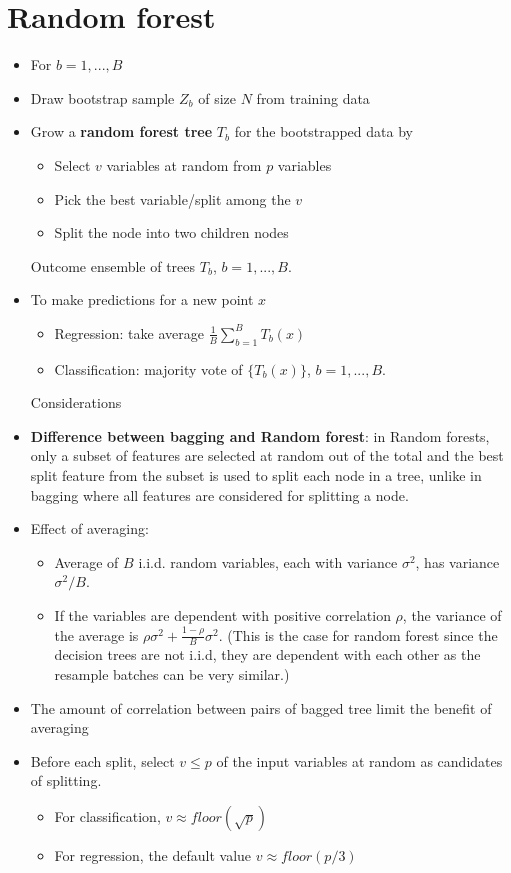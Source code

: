 \documentclass[twoside,12pt]{article}
\begin{document}
\section{Random forest}
\begin{itemize}
\item For $b=1,...,B$
\item Draw bootstrap sample $Z_b$ of size $N$ from training data
\item Grow a \textbf{random forest tree} $T_b$ for the bootstrapped data by 
\begin{itemize}
\item Select $v$ variables at random from $p$ variables 
\item Pick the best variable/split among the $v$ 
\item Split the node into two children nodes \\
\end{itemize}
Outcome ensemble of trees $T_b$, $b = 1, ..., B$.
\item To make predictions for a new point $x$
\begin{itemize}
\item Regression: take average $\frac 1 B \sum_{b = 1}^B T_b(x)$
\item Classification: majority vote of $\{T_b(x)\}$, $b = 1, ..., B.$
\end{itemize}
\noindent Considerations 
\item \textbf{Difference between bagging and Random forest}: in Random forests, only a subset of features are selected at random out of the total and the best split feature from the subset is used to split each node in a tree, unlike in bagging where all features are considered for splitting a node.

\item Effect of averaging: 
\begin{itemize}
\item Average of $B$ i.i.d. random variables, each with variance $\sigma^2$, has variance $\sigma^2/B$.
\item If the variables are dependent with positive correlation $\rho$, the variance of the average is $\rho \sigma^2 + \frac{1-\rho}{B}\sigma^2$. (This is the case for random forest since the decision trees are not i.i.d, they are dependent with each other as the resample batches can be very similar.)
\end{itemize}
\item The amount of correlation between pairs of bagged tree limit the benefit of averaging 
\item Before each split, select $v \leq p$ of the input variables at random as candidates of splitting.
\begin{itemize}
\item For classification, $v \approx floor(\sqrt{p})$
\item For regression, the default value $v \approx floor(p/3)$
\end{itemize}
\end{itemize}
\end{document}
